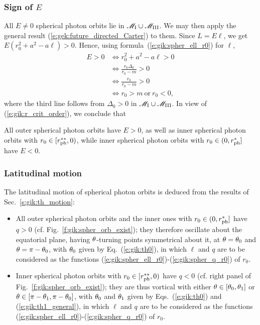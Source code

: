 \subsubsection{Sign of $E$}

All $E\neq 0$ spherical photon orbits lie in $\mathscr{M}_{\rm I}\cup\mathscr{M}_{\rm III}$. We may then apply
the general result (\ref{e:gek:future_directed_Carter}) to them. Since $L = E \ell$, we get
$E (r_0^2 + a^2 - a \ell) > 0$.
Hence, using formula~(\ref{e:gik:spher_ell_r0}) for $\ell$,
\begin{align}
E > 0 & \iff r_0^2 + a^2 - a \ell > 0 \nonumber \\
      & \iff \frac{r_0 \Delta_0}{r_0 - m} > 0 \nonumber \\
      & \iff \frac{r_0}{r_0 - m} > 0  \nonumber \\
      & \iff r_0 > m \ \mbox{or}\ r_0 < 0 , \nonumber
\end{align}
where the third line follows from $\Delta_0 > 0$ in $\mathscr{M}_{\rm I}\cup\mathscr{M}_{\rm III}$.
In view of (\ref{e:gik:r_crit_order}), we conclude that
\begin{greybox}
All outer spherical photon orbits have $E>0$, as well as inner spherical photon
orbits with $r_0\in[r_{\rm ph}^{**}, 0)$, %
while inner spherical photon orbits with $r_0\in(0, r_{\rm ph}^*]$
have $E<0$.
\end{greybox}

\subsubsection{Latitudinal motion}

The latitudinal motion of spherical photon orbits is
deduced from the results of Sec.~\ref{s:gik:th_motion}:
\begin{itemize}
\item All outer spherical photon orbits and the inner ones with $r_0\in (0, r_{\rm ph}^{*}]$
have $q>0$ (cf. Fig.~\ref{f:gik:spher_orb_exist}); they
therefore oscillate about the equatorial plane, having $\theta$-turning points
symmetrical about it, at $\theta=\theta_0$ and $\theta=\pi-\theta_0$, with
$\theta_0$ given by Eq.~(\ref{e:gik:th0}),
in which $\ell$ and $q$ are to be considered as the functions
(\ref{e:gik:spher_ell_r0})-(\ref{e:gik:spher_q_r0}) of $r_0$.
\item Inner spherical photon orbits with $r_0 \in [r_{\rm ph}^{**}, 0)$ %
have $q<0$ (cf. right panel of Fig.~\ref{f:gik:spher_orb_exist}); they are thus vortical
with either $\theta\in[\theta_0, \theta_1]$ or $\theta\in[\pi-\theta_1, \pi-\theta_0]$, with
$\theta_0$ and $\theta_1$ given by Eqs.~(\ref{e:gik:th0}) and (\ref{e:gik:th1_general}), in which
$\ell$ and $q$ are to be considered as the functions
(\ref{e:gik:spher_ell_r0})-(\ref{e:gik:spher_q_r0}) of $r_0$.
\end{itemize}


